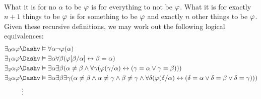 \begin{align*}
\end{align*}
What it is for no $\alpha$ to be $\varphi$ is for everything to not be $\varphi$. 
What it is for exactly $n+1$ things to be $\varphi$ is for something to be $\varphi$ and exactly $n$ other things to be $\varphi$.
Given these recursive definitions, we may work out the following logical equivalences:
\begin{align*}
  \qt{\exists_0}{\alpha}\metaA &\Dashv\vDash \qt{\forall}{\alpha}\enot\metaA(\alpha)\\
  \qt{\exists_1}{\alpha}\metaA
    &\Dashv\vDash \qt{\exists}{\alpha}\qt{\forall}{\beta}(\metaA[\beta/\alpha] \eiff \beta = \alpha)\\ 
  \qt{\exists_2}{\alpha}\metaA &\Dashv\vDash \qt{\exists}{\alpha}\qt{\exists}{\beta}(\alpha\neq\beta \eand \qt{\forall}{\gamma}(\metaA(\gamma/\alpha) \eiff (\gamma = \alpha \eor \gamma = \beta)))\\
  \qt{\exists_3}{\alpha}\metaA &\Dashv\vDash \qt{\exists}{\alpha}
      \qt{\exists}{\beta}
        \qt{\exists}{\gamma}(
          \alpha\neq\beta \eand \alpha\neq\gamma \eand \beta\neq\gamma \eand \qt{\forall}{\delta}(
            \metaA(\delta/\alpha) \eiff (
              \delta = \alpha \eor \delta = \beta \eor \delta = \gamma
            )
          )
        )\\
  & ~\vdots
\end{align*}
